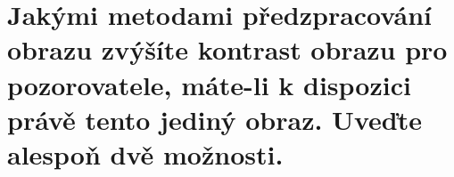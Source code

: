 \section{Jakými metodami předzpracování obrazu zvýšíte kontrast obrazu pro pozorovatele, máte-li k dispozici právě tento 
jediný obraz. Uveďte alespoň dvě možnosti.}
